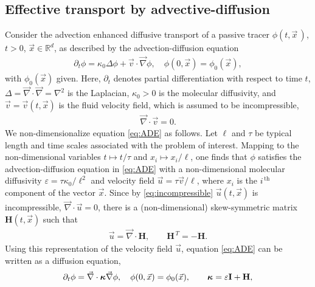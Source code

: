 \documentclass[11pt]{amsart}
\newcommand{\Hb}{\mathbf{H}}
\newcommand{\Ib}{\mathbf{I}}
\newcommand\bkappa{\mbox{\boldmath${\kappa}$}}
\begin{document}
\subsection{Effective transport by
  advective-diffusion} \label{sec:Eff_Trans}  
%
Consider the advection enhanced diffusive transport of a passive
tracer $\phi(t,\vec{x}\,)$, $t>0$, $\vec{x}\in\mathbb{R}^d$, as described by
the advection-diffusion equation 
%
\begin{align}\label{eq:ADE}
  \partial_t\phi=\kappa_0\Delta \phi+\vec{v}\cdot\vec{\nabla}\phi, \quad
  \phi(0,\vec{x})=\phi_0(\vec{x}),
\end{align}
% 
with $\phi_0(\vec{x})$ given. Here, $\partial_t$ denotes partial differentiation
with respect to time $t$, $\Delta=\vec{\nabla}\cdot\vec{\nabla}=\nabla^2$ is the Laplacian,
$\kappa_0>0$ is the molecular diffusivity, and $\vec{v}=\vec{v}(t,\vec{x})$
is the fluid velocity field, which is assumed to be incompressible,
%
\begin{align}\label{eq:incompressible}
  \vec{\nabla}\cdot\vec{v}=0.
\end{align}
%
We non-dimensionalize equation
\eqref{eq:ADE} as follows. Let $\ell$ and $\tau$ be typical length and time 
scales associated with the problem of interest. Mapping to the
non-dimensional variables $t\mapsto t/\tau$ and $x_i\mapsto x_i/\ell$, one finds that
$\phi$ satisfies the advection-diffusion 
equation in \eqref{eq:ADE} with a non-dimensional molecular
diffusivity $\varepsilon=\tau\kappa_0/\ell^2$ and velocity field $\vec{u}=\tau\vec{v}/\ell$,
where $x_i$ is the $i^{\,\text{th}}$ component of the vector
$\vec{x}$. Since by \eqref{eq:incompressible} $\vec{u}(t,\vec{x})$ is
incompressible, $\vec{\nabla}\cdot\vec{u}=0$, there is a (non-dimensional)
skew-symmetric matrix $\Hb(t,\vec{x})$ such that
\begin{align}
 \vec{u}=\vec{\nabla}\cdot\Hb, \qquad  \Hb^{\,T}=-\Hb.
\end{align}
Using this representation of the velocity field $\vec{u}$, equation
\eqref{eq:ADE} can be written as a diffusion equation, 
%
\begin{align}\label{eq:ADE_Divergence}
  \partial_t\phi%
    =\vec{\nabla}\cdot\bkappa\vec{\nabla}\phi, \quad
    \phi(0,\vec{x})=\phi_0(\vec{x}),
    \qquad
    \bkappa=\varepsilon\Ib+\Hb,
\end{align}
\end{document}
